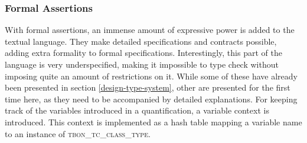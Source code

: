\subsubsection{Formal Assertions}
With formal assertions, an immense amount of expressive power is added to the textual \bon{} language. They make detailed specifications and contracts possible, adding extra formality to formal specifications. Interestingly, this part of the language is very underspecified, making it impossible to type check without imposing quite an amount of restrictions on it. While some of these have already been presented in section \ref{design-type-system}, other are presented for the first time here, as they need to be accompanied by detailed explanations.
\label{implementation-formal-assertions}
For keeping track of the variables introduced in a quantification, a variable context is introduced. This context is implemented as a hash table mapping a variable name to an instance of \textsc{tbon\_tc\_class\_type}.

